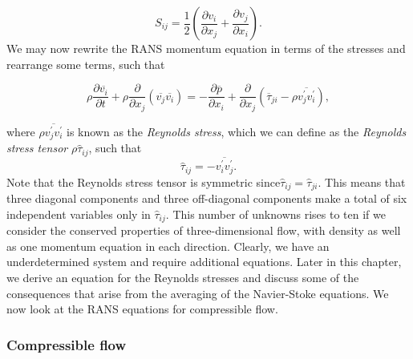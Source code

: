 \begin{equation}
    S_{ij} = \frac{1}{2}\left(\frac{\partial v_i}{\partial x_j}+\frac{\partial v_j
    }{\partial x_i}\right).
\end{equation}
We may now rewrite the RANS momentum equation in terms of the stresses and rearrange some terms, such that
\begin{eqBox}
\begin{equation}
    \rho \frac{\partial \overline{v_i}}{\partial t} 
    + \rho  \frac{\partial}{\partial x_j} \left(\overline{v_j}\overline{v_i}\right)
    =- \frac{\partial \overline{p}}{\partial x_i} 
	+ \frac{\partial}{\partial x_j} \left(\overline\tau_{ji} - \rho \overline{v_j^\prime v_i^\prime}\right),
	\label{eq:rans_momentum}
\end{equation}
\end{eqBox}
where $\rho \overline{v_j^\prime v_i^\prime}$ is known as the \textit{Reynolds stress}, which we can define as the \textit{Reynolds stress tensor} $\rho\hat\tau_{ij}$, such that
\begin{equation}
	\hat\tau_{ij} = -\overline{v_i^\prime v_j^\prime}.
\end{equation}
Note that the Reynolds stress tensor is symmetric since$\hat\tau_{ij}=\hat\tau_{ji}$. This means that three diagonal components and three off-diagonal components make a total of six independent variables only in $\hat\tau_{ij}$. This number of unknowns rises to ten if we consider the conserved properties of three-dimensional flow, with density as well as one momentum equation in each direction. Clearly, we have an underdetermined system and require additional equations. Later in this chapter, we derive an equation for the Reynolds stresses and discuss some of the consequences that arise from the averaging of the Navier-Stoke equations. We now look at the RANS equations for compressible flow.

\subsubsection{Compressible flow}

